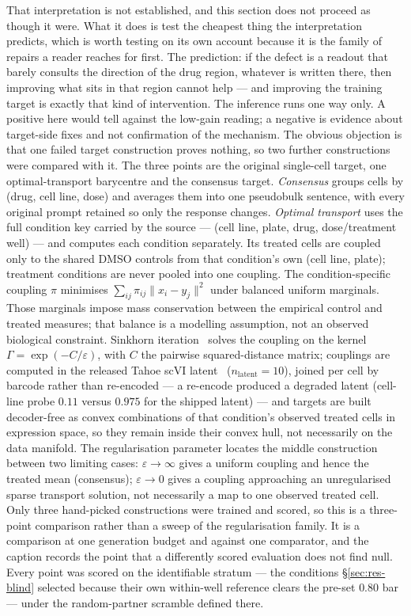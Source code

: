 That interpretation is not established, and this section does not proceed as though it were. What it
does is test the cheapest thing the interpretation predicts, which is worth testing on its own
account because it is the family of repairs a reader reaches for first. The prediction: if the
defect is a readout that barely consults the direction of the drug region, whatever is written
there, then improving what sits in that region cannot help --- and improving the training target is
exactly that kind of intervention. The inference runs one way only. A positive here would tell
against the low-gain reading; a negative is evidence about target-side fixes and not confirmation of
the mechanism. The obvious objection is that one failed target construction proves
nothing, so two further constructions were compared with it. The three points are the original
single-cell target, one optimal-transport barycentre and the consensus target.
\emph{Consensus} groups cells by (drug, cell line, dose) and averages them into one pseudobulk
sentence, with every original prompt retained so only the response changes. \emph{Optimal transport}
uses the full condition key carried by the source --- (cell line, plate, drug, dose/treatment well)
--- and computes each condition separately. Its treated cells are coupled only to the shared DMSO
controls from that condition's own (cell line, plate); treatment conditions are never pooled into
one coupling. The condition-specific coupling $\pi$ minimises
$\sum_{ij}\pi_{ij}\lVert x_i - y_j\rVert^2$ under balanced uniform marginals. Those marginals impose
mass conservation between the empirical control and treated measures; that balance is a modelling
assumption, not an observed biological constraint. Sinkhorn
iteration~\cite{cuturi} solves the coupling on the kernel $\Gamma = \exp(-C/\varepsilon)$, with $C$
the pairwise squared-distance matrix; couplings are computed in the released Tahoe scVI
latent~\cite{scvi} ($n_{\textrm{latent}} = 10$), joined per cell by barcode rather than re-encoded ---
a re-encode produced a degraded latent (cell-line probe $0.11$ versus $0.975$ for the shipped latent)
--- and targets are built decoder-free as convex combinations of that condition's observed treated
cells in expression space, so they remain inside their convex hull, not necessarily on the data
manifold. The regularisation
parameter locates the middle construction between two limiting cases:
$\varepsilon\rightarrow\infty$ gives a uniform
coupling and hence the treated mean (consensus); $\varepsilon\rightarrow 0$ gives a coupling
approaching an unregularised sparse transport solution, not necessarily a map to one
observed treated cell. Only three hand-picked constructions were trained and scored, so this is a
three-point comparison rather than a sweep of the regularisation family. It is a comparison at one
generation budget and against one comparator, and the caption records the point that a differently
scored evaluation does not find null. Every point was scored on the identifiable stratum --- the conditions
\S\ref{sec:res-blind} selected because their own within-well reference clears the pre-set $0.80$ bar
--- under the random-partner scramble
defined there.

